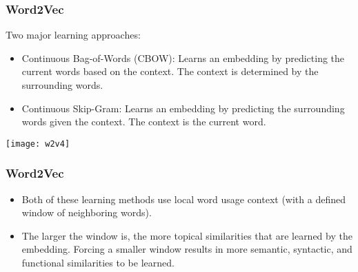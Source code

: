 \begin{frame}[fragile]\frametitle{Word2Vec}
Two major learning approaches:
  \begin{itemize}
    \item Continuous Bag-of-Words (CBOW): Learns an embedding by predicting the current words based on the context. The context is determined by the surrounding words.
	\item Continuous Skip-Gram: Learns an embedding by predicting the surrounding words given the context. The context is the current word.
  \end{itemize}
  
\begin{center}
\texttt{[image: w2v4]}
\end{center}

\end{frame}


\begin{frame}[fragile]\frametitle{Word2Vec}
  \begin{itemize}
    \item Both of these learning methods use local word usage context (with a defined window of neighboring words). 
	\item The larger the window is, the more topical similarities that are learned by the embedding. Forcing a smaller window results in more semantic, syntactic, and functional similarities to be learned.
  \end{itemize}

\end{frame}

